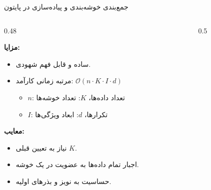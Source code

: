 \begin{frame}{جمع‌بندی خوشه‌بندی  و پیاده‌سازی در پایتون}{}
  \begin{columns}[T]
    \begin{column}{0.48\textwidth}
      {\fontsize{8.5}{11}\selectfont
      \textbf{مزایا:}
      \begin{itemize}
        \item ساده و قابل فهم شهودی.
        \item مرتبه زمانی کارآمد: $\mathcal{O}(n \cdot K \cdot I \cdot d)$
        \begin{itemize}
          \item $n$: تعداد داده‌ها، $K$: تعداد خوشه‌ها
          \item $I$: تکرارها، $d$: ابعاد ویژگی‌ها
        \end{itemize}
      \end{itemize}
      \textbf{معایب:}
      \begin{itemize}
        \item نیاز به تعیین قبلی $K$.
        \item اجبار تمام داده‌ها به عضویت در یک خوشه.
        \item حساسیت به نویز و بذرهای اولیه.
      \end{itemize}
      }
    \end{column}
    \begin{column}{0.5\textwidth}
      \begin{latin}
        \begin{minipage}{\textwidth}
        \end{minipage}
      \end{latin}
    \end{column}
  \end{columns}
\end{frame}
